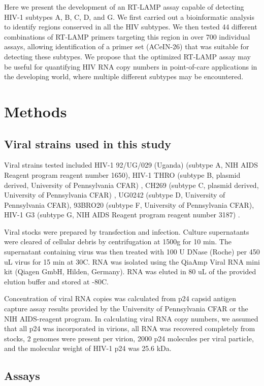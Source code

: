 \documentclass[../sherrill-Mix_thesis.tex]{subfiles}
\begin{document}
	Here we present the development of an RT-LAMP assay capable of detecting HIV-1 subtypes A, B, C, D, and G. We first carried out a bioinformatic analysis to identify regions conserved in all the HIV subtypes. We then tested 44 different combinations of RT-LAMP primers targeting this region in over 700 individual assays, allowing identification of a primer set (ACeIN-26) that was suitable for detecting these subtypes. We propose that the optimized RT-LAMP assay may be useful for quantifying HIV RNA copy numbers in point-of-care applications in the developing world, where multiple different subtypes may be encountered.

\section{Methods}
	\subsection{Viral strains used in this study}
	Viral strains tested included HIV-1 92/UG/029 (Uganda) (subtype A, NIH AIDS Reagent program reagent number 1650), HIV-1 THRO (subtype B, plasmid derived, University of Pennsylvania CFAR) \citep{Parrish2013}, CH269 (subtype C, plasmid derived, University of Pennsylvania CFAR) \citep{Parrish2013}, UG0242 (subtype D, University of Pennsylvania CFAR), 93BRO20 (subtype F, University of Pennsylvania CFAR), HIV-1 G3 (subtype G, NIH AIDS Reagent program reagent number 3187) \citep{Abimiku1994}.

	Viral stocks were prepared by transfection and infection. Culture supernatants were cleared of cellular debris by centrifugation at 1500g for 10 min. The supernatant containing virus was then treated with 100 U DNase (Roche) per 450 uL virus for 15 min at 30\degree{}C. RNA was isolated using the QiaAmp Viral RNA mini kit (Qiagen GmbH, Hilden, Germany). RNA was eluted in 80 uL of the provided elution buffer and stored at -80\degree{}C.

	Concentration of viral RNA copies was calculated from p24 capsid antigen capture assay results provided by the University of Pennsylvania CFAR or the NIH AIDS-reagent program. In calculating viral RNA copy numbers, we assumed that all p24 was incorporated in virions, all RNA was recovered completely from stocks, 2 genomes were present per virion, 2000 p24 molecules per viral particle, and the molecular weight of HIV-1 p24 was 25.6 kDa.

	\subsection{Assays}
\end{document}
